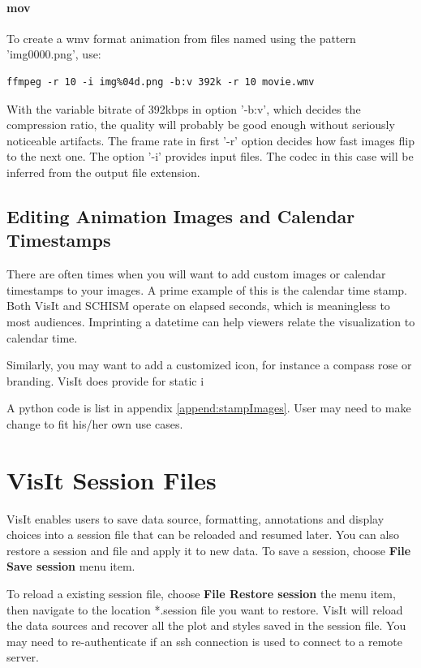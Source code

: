 \documentclass[12pt]{report}
\begin{document}
\paragraph{mov}
To create a wmv format animation from files named using the pattern 'img0000.png', use:
\begin{verbatim} 
ffmpeg -r 10 -i img%04d.png -b:v 392k -r 10 movie.wmv
\end{verbatim}
With the variable bitrate of 392kbps in option '-b:v', which decides the compression ratio, the quality will probably be good enough without seriously noticeable artifacts. The frame rate in first '-r' option decides how fast images flip to the next one. The option '-i' provides input files. The codec in this case will be inferred from the output file extension. 


								
\subsection {Editing Animation Images and Calendar Timestamps}

There are often times when you will want to add custom images or calendar timestamps
to your images. A prime example of this is the calendar time stamp. Both VisIt 
and SCHISM operate on elapsed seconds, which is meaningless to most audiences.
Imprinting a datetime can help viewers relate the visualization to 
calendar time. 

Similarly, you may want to add a customized icon, for instance a compass rose or branding.
VisIt does provide for static i

A python code is list in appendix \ref{append:stampImages}. User may need to make change to fit his/her own use cases.
				
				
\section{VisIt Session Files}
				
VisIt enables users to save data source, formatting, annotations and display 
choices into a session file that can be reloaded and resumed later. 
You can also restore a session and file and apply it to new data.
To save a session, choose {\bf File \textrightarrow Save session} menu item. 
				
To reload a existing session file, choose {\bf File \textrightarrow \bf Restore session} the
menu item, then navigate to the location *.session file you want to restore.
VisIt will reload the data sources and recover all the plot and styles saved
in the session file. You may need to re-authenticate if an ssh connection is
used to connect to a remote server. 
								
\end{document}
